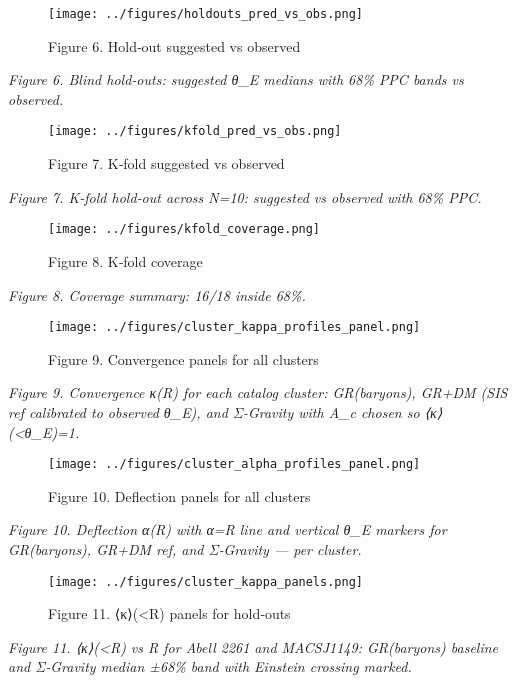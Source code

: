 \documentclass[11pt,a4paper]{article}
\begin{document}
\begin{figure}[h]
\centering
\texttt{[image: ../figures/holdouts\_pred\_vs\_obs.png]}
\caption{Figure 6. Hold‑out suggested vs observed}
\end{figure}


\textit{Figure 6. Blind hold‑outs: suggested θ\_E medians with 68\% PPC bands vs observed.}


\begin{figure}[h]
\centering
\texttt{[image: ../figures/kfold\_pred\_vs\_obs.png]}
\caption{Figure 7. K‑fold suggested vs observed}
\end{figure}


\textit{Figure 7. K‑fold hold‑out across N=10: suggested vs observed with 68\% PPC.}


\begin{figure}[h]
\centering
\texttt{[image: ../figures/kfold\_coverage.png]}
\caption{Figure 8. K‑fold coverage}
\end{figure}


\textit{Figure 8. Coverage summary: 16/18 inside 68\%.}


\begin{figure}[h]
\centering
\texttt{[image: ../figures/cluster\_kappa\_profiles\_panel.png]}
\caption{Figure 9. Convergence panels for all clusters}
\end{figure}


\textit{Figure 9. Convergence κ(R) for each catalog cluster: GR(baryons), GR+DM (SIS ref calibrated to observed θ\_E), and Σ‑Gravity with A\_c chosen so ⟨κ⟩(<θ\_E)=1.}


\begin{figure}[h]
\centering
\texttt{[image: ../figures/cluster\_alpha\_profiles\_panel.png]}
\caption{Figure 10. Deflection panels for all clusters}
\end{figure}


\textit{Figure 10. Deflection α(R) with α=R line and vertical θ\_E markers for GR(baryons), GR+DM ref, and Σ‑Gravity — per cluster.}


\begin{figure}[h]
\centering
\texttt{[image: ../figures/cluster\_kappa\_panels.png]}
\caption{Figure 11. ⟨κ⟩(<R) panels for hold‑outs}
\end{figure}


\textit{Figure 11. ⟨κ⟩(<R) vs R for Abell 2261 and MACSJ1149: GR(baryons) baseline and Σ‑Gravity median ±68\% band with Einstein crossing marked.}
\end{document}
